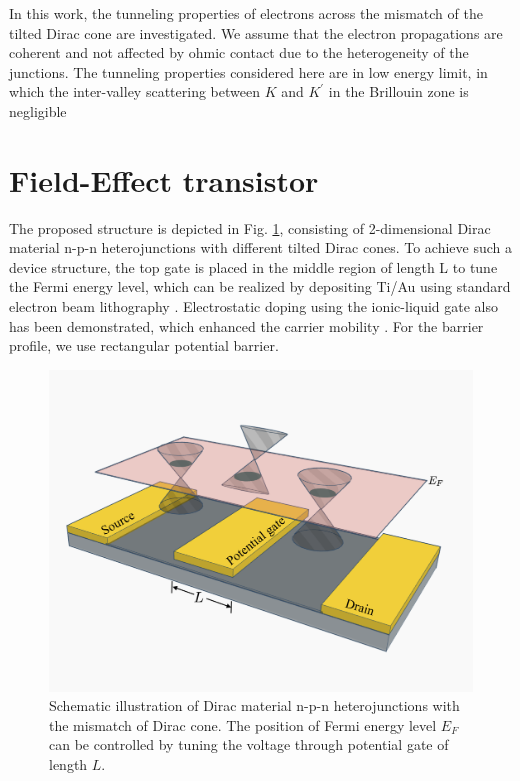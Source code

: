 In this work, the tunneling properties of electrons across the mismatch of the tilted Dirac cone are investigated.
We assume that the electron propagations are coherent and not affected by ohmic contact due to the heterogeneity of the junctions. 
The tunneling properties considered here are in low energy limit, in which the inter-valley scattering between $K$ and $K^\prime$ in the Brillouin zone is negligible \cite{Abergel2009}
\section{Field-Effect transistor}
    The proposed structure is depicted in Fig. \ref{fig:transistor}, consisting of 2-dimensional Dirac material n-p-n heterojunctions with different tilted Dirac cones. 
    To achieve such a device structure, the top gate is placed in the middle region of length L to tune the Fermi energy level, which can be realized by depositing Ti/Au using standard electron beam lithography \cite{Huard2007}.
    Electrostatic doping using the ionic-liquid gate also has been demonstrated, which enhanced the carrier mobility \cite{Perera2013}. 
    For the barrier profile, we use rectangular potential barrier.
    \begin{figure}[H]
        \centering
        \includegraphics[width=\linewidth]{fig/Transistor.png}
        \caption{Schematic illustration of Dirac material n-p-n heterojunctions with the mismatch of Dirac cone. 
                    The position of Fermi energy level $E_F$ can be controlled by tuning the voltage through potential gate of length $L$.}
        \label{fig:transistor}
    \end{figure}

